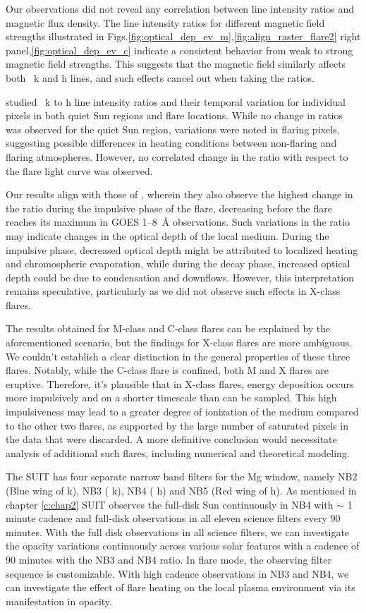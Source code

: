 Our observations did not reveal any correlation between line intensity ratios and magnetic flux density. The line intensity ratios for different magnetic field strengths illustrated in Figs.\ref{fig:optical_dep_ev_m},\ref{fig:align_raster_flare2} right panel,\ref{fig:optical_dep_ev_c} indicate a consistent behavior from weak to strong magnetic field strengths. This suggests that the magnetic field similarly affects both  ~k and h lines, and such effects cancel out when taking the ratios.

\cite{kerr15} studied  ~k to h line intensity ratios and their temporal variation for individual pixels in both quiet Sun regions and flare locations. While no change in ratios was observed for the quiet Sun region, variations were noted in flaring pixels, suggesting possible differences in heating conditions between non-flaring and flaring atmospheres. However, no correlated change in the ratio with respect to the flare light curve was observed.

Our results align with those of \cite{kerr15}, wherein they also observe the highest change in the ratio during the impulsive phase of the flare, decreasing before the flare reaches its maximum in GOES 1{--}8~{\AA} observations. Such variations in the ratio may indicate changes in the optical depth of the local medium. During the impulsive phase, decreased optical depth might be attributed to localized heating and chromospheric evaporation, while during the decay phase, increased optical depth could be due to condensation and downflows. However, this interpretation remains speculative, particularly as we did not observe such effects in X-class flares.

The results obtained for M-class and C-class flares can be explained by the aforementioned scenario, but the findings for X-class flares are more ambiguous. We couldn't establish a clear distinction in the general properties of these three flares. Notably, while the C-class flare is confined, both M and X flares are eruptive. Therefore, it's plausible that in X-class flares, energy deposition occurs more impulsively and on a shorter timescale than can be sampled. This high impulsiveness may lead to a greater degree of ionization of the medium compared to the other two flares, as supported by the large number of saturated pixels in the data that were discarded. A more definitive conclusion would necessitate analysis of additional such flares, including numerical and theoretical modeling.

The SUIT has four separate narrow band filters for the Mg window, namely NB2 (Blue wing of   k), NB3 (  k), NB4 (  h) and NB5 (Red wing of   h). As mentioned in chapter \ref{c:chap2} SUIT observes the full-disk Sun continuously in NB4 with $\sim$ 1 minute cadence and full-disk observations in all eleven science filters every 90 minutes. With the full disk observations in all science filters, we can investigate the opacity variations continuously across various solar features with a cadence of 90 minutes with the NB3 and NB4 ratio. In flare mode, the observing filter sequence is customizable. With high cadence observations in NB3 and NB4, we can investigate the effect of flare heating on the local plasma environment via its manifestation in opacity.